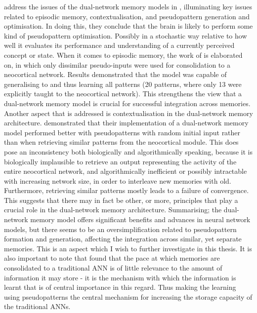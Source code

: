 \cite{French2001} address the issues of the dual-network memory models in \citep{French1997, Ans1997}, illuminating key issues related to episodic memory, contextualisation, and pseudopattern generation and optimisation. In doing this, they conclude that the brain is likely to perform some kind of pseudopattern optimisation. Possibly in a stochastic way relative to how well it evaluates its performance and understanding of a currently perceived concept or state. When it comes to episodic memory, the work of \cite{Ans2000} is elaborated on, in which only dissimilar pseudo-inputs were used for consolidation to a neocortical network. Results demonstrated that the model was capable of generalising to and thus learning all patterns (20 patterns, where only 13 were explicitly taught to the neocortical network). This strengthens the view that a dual-network memory model is crucial for successful integration across memories. Another aspect that is addressed is contextualisation in the dual-network memory architecture. \cite{Ans2000} demonstrated that their implementation of a dual-network memory model performed better with pseudopatterns with random initial input rather than when retrieving similar patterns from the neocortical module. This does pose an inconsistency both biologically and algorithmically speaking, because it is biologically implausible to retrieve an output representing the activity of the entire neocortical network, and algorithmically inefficient or possibly intractable with increasing network size, in order to interleave new memories with old. Furthermore, retrieving similar patterns mostly leads to a failure of convergence. This suggests that there may in fact be other, or more, principles that play a crucial role in the dual-network memory architecture. Summarising; the dual-network memory model offers significant benefits and advances in neural network models, but there seems to be an oversimplification related to pseudopattern formation and generation, affecting the integration across similar, yet separate memories. This is an aspect which I wish to further investigate in this thesis.
It is also important to note that \citep{French2001} found that the pace at which memories are consolidated to a traditional ANN is of little relevance to the amount of information it may store - it is the mechanism with which the information is learnt that is of central importance in this regard. Thus making the learning using pseudopatterns the central mechanism for increasing the storage capacity of the traditional ANNs.

